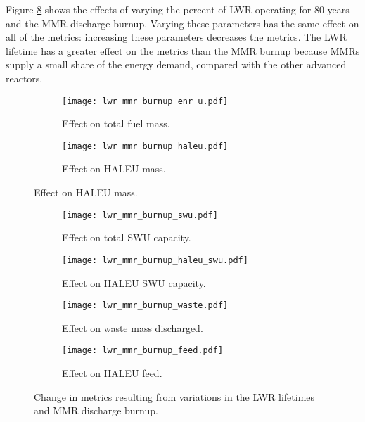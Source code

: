 Figure \ref{fig:lwr_mmr_burnup} shows the effects of varying the percent 
of \gls{LWR} operating for 80 years and the \gls{MMR} discharge burnup. 
Varying these parameters has the same effect on all of the metrics: 
increasing these parameters decreases the metrics. The \gls{LWR} lifetime 
has a greater effect on the metrics than the \gls{MMR} burnup because 
\glspl{MMR} supply a small share of the energy demand, compared with 
the other advanced reactors. 
\begin{figure}
    \begin{subfigure}[t]{0.48\textwidth}
        \centering
        \texttt{[image: lwr\_mmr\_burnup\_enr\_u.pdf]}
        \caption{Effect on total fuel mass.}
        \label{fig:lwr_mmr_burnup__enr_u}
    \end{subfigure}
    \hfill
    \begin{subfigure}[t]{0.48\textwidth}
        \centering
        \texttt{[image: lwr\_mmr\_burnup\_haleu.pdf]}
        \caption{Effect on HALEU mass.}
        \label{fig:lwr_mmr_burnup_haleu}
    \end{subfigure}
\end{figure}
\begin{figure}
    \ContinuedFloat    
    \begin{subfigure}[t]{0.48\textwidth}
        \centering
        \texttt{[image: lwr\_mmr\_burnup\_swu.pdf]}
        \caption{Effect on total SWU capacity.}
        \label{fig:lwr_mmr_burnup_swu}
    \end{subfigure}
    \hfill
    \begin{subfigure}[t]{0.48\textwidth}
        \centering
        \texttt{[image: lwr\_mmr\_burnup\_haleu\_swu.pdf]}
        \caption{Effect on HALEU SWU capacity.}
        \label{fig:lwr_mmr_burnup_haleu_swu}
    \end{subfigure}
    
    \begin{subfigure}[t]{0.48\textwidth}
        \centering
        \texttt{[image: lwr\_mmr\_burnup\_waste.pdf]}
        \caption{Effect on waste mass discharged.}
        \label{fig:lwr_mmr_burnup_waste}
    \end{subfigure}
    \hfill
    \begin{subfigure}[t]{0.48\textwidth}
        \centering
        \texttt{[image: lwr\_mmr\_burnup\_feed.pdf]}
        \caption{Effect on HALEU feed.}
        \label{fig:lwr_mmr_burnup_feed}
    \end{subfigure}
    \caption{Change in metrics resulting from variations in the 
    LWR lifetimes and MMR discharge burnup.}
    \label{fig:lwr_mmr_burnup}
\end{figure}

